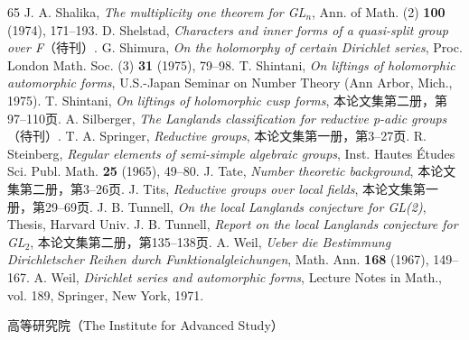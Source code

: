 \begin{thebibliography}{65}
 J. A. Shalika, \emph{The multiplicity one theorem for GL$_n$}, Ann. of Math. (2) \textbf{100} (1974), 171--193.
 D. Shelstad, \emph{Characters and inner forms of a quasi-split group over F}（待刊）.
 G. Shimura, \emph{On the holomorphy of certain Dirichlet series}, Proc. London Math. Soc. (3) \textbf{31} (1975), 79--98.
 T. Shintani, \emph{On liftings of holomorphic automorphic forms}, U.S.-Japan Seminar on Number Theory (Ann Arbor, Mich., 1975).
 T. Shintani, \emph{On liftings of holomorphic cusp forms}, 本论文集第二册，第97--110页.
 A. Silberger, \emph{The Langlands classification for reductive p-adic groups}（待刊）.
 T. A. Springer, \emph{Reductive groups}, 本论文集第一册，第3--27页.
 R. Steinberg, \emph{Regular elements of semi-simple algebraic groups}, Inst. Hautes Études Sci. Publ. Math. \textbf{25} (1965), 49--80.
 J. Tate, \emph{Number theoretic background}, 本论文集第二册，第3--26页.
 J. Tits, \emph{Reductive groups over local fields}, 本论文集第一册，第29--69页.
 J. B. Tunnell, \emph{On the local Langlands conjecture for GL(2)}, Thesis, Harvard Univ.
 J. B. Tunnell, \emph{Report on the local Langlands conjecture for GL$_2$}, 本论文集第二册，第135--138页.
 A. Weil, \emph{Ueber die Bestimmung Dirichletscher Reihen durch Funktionalgleichungen}, Math. Ann. \textbf{168} (1967), 149--167.
 A. Weil, \emph{Dirichlet series and automorphic forms}, Lecture Notes in Math., vol. 189, Springer, New York, 1971.
\end{thebibliography}
\begin{flushright}高等研究院（The Institute for Advanced Study）\end{flushright}

